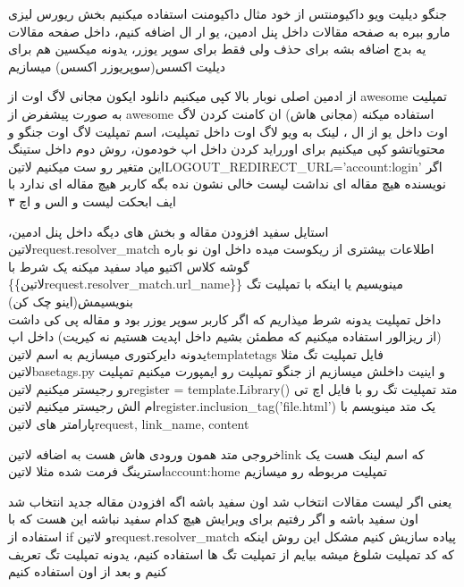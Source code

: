 \documentclass{article}
\begin{document}
	 جنگو دیلیت ویو داکیومنتس از خود مثال داکیومنت استفاده میکنیم بخش ریورس لیزی مارو ببره به صفحه مقالات داخل پنل ادمین،‌ یو ار ال 
	 اضافه کنیم، داخل صفحه مقالات یه بدج اضافه بشه برای حذف ولی فقط برای سوپر یوزر، یدونه میکسین هم برای دیلیت اکسس(سوپریوزر اکسس) میسازیم
	 
	 از ادمین اصلی نوبار بالا کپی میکنیم دانلود ایکون مجانی لاگ اوت از awesome تمپلیت به صورت پیشفرض از awesome استفاده میکنه (مجانی هاش)
	 ان کامنت کردن لاگ اوت داخل یو از ال ، لینک به ویو لاگ اوت داخل تمپلیت، اسم تمپلیت لاگ اوت جنگو و محتویاتشو کپی میکنیم برای اورراید کردن 
	 داخل اپ خودمون، روش دوم داخل ستینگ این متغیر رو ست میکنیم ‌لاتین{LOGOUT\_REDIRECT\_URL='account:login'} 
	  اگر نویسنده هیچ مقاله ای نداشت لیست خالی نشون نده بگه کاربر هیچ مقاله ای ندارد با ایف ابحکت لیست و الس و اچ ۳
	 
	 
	 استایل سفید افزودن مقاله و بخش های دیگه داخل پنل ادمین، ‌لاتین{request.resolver\_match} اطلاعات بیشتری از ریکوست میده
	 داخل اون نو باره گوشه کلاس اکتیو میاد سفید میکنه یک شرط با\\
	  \{\{‌لاتین{request.resolver\_match.url\_name}\}\} مینویسیم یا اینکه با تمپلیت تگ بنویسیمش(اینو چک کن)\\
	  داخل تمپلیت یدونه شرط میذاریم که اگر کاربر سوپر یوزر بود و مقاله پی کی داشت (از ریزالور استفاده میکنیم که مطمئن بشیم داخل 
	  اپدیت هستیم نه کیریت)
	  		 داخل اپ یدونه دایرکتوری میسازیم به اسم ‌لاتین{templatetags}
	  		 فایل تمپلیت تگ مثلا ‌لاتین{basetags.py} و اینیت داخلش میسازیم
	  		 از جنگو تمپلیت رو ایمپورت میکنیم
	  		 تمپلیت رو رجیستر میکنیم ‌لاتین{register = template.Library()}
			 متد تمپلیت تگ رو با فایل اچ تی ام الش رجیستر میکنیم ‌لاتین{register.inclusion\_tag('file.html')}
			 یک متد مینویسم با پارامتر های ‌لاتین{request, link\_name, content}
			

	  		 خروجی متد همون ورودی هاش هست به اضافه ‌لاتین{link} که اسم لینک هست یک استرینگ فرمت شده مثلا ‌لاتین{account:home}
	  		 تمپلیت مربوطه رو میسازیم 
	  		



			یعنی اگر لیست مقالات انتخاب شد اون سفید باشه اگه افزودن مقاله جدید انتخاب شد اون سفید باشه و اگر رفتیم برای ویرایش هیچ کدام
			سفید نباشه
			 این هست که با استفاده از if و ‌لاتین{request.resolver\_match} پیاده سازیش کنیم مشکل این روش اینکه که
			کد تمپلیت شلوغ میشه 
			 بیایم از تمپلیت تگ ها استفاده کنیم، یدونه تمپلیت تگ تعریف کنیم و بعد از اون استفاده کنیم
			
\end{document}
